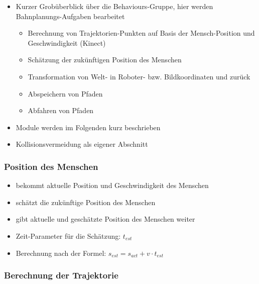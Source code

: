 \begin{itemize}
	\item Kurzer Grobüberblick über die Behaviours-Gruppe, hier werden Bahnplanungs-Aufgaben bearbeitet
	\begin{itemize}
		\item Berechnung von Trajektorien-Punkten auf Basis der Mensch-Position und Geschwindigkeit (Kinect)
		\item Schätzung der zukünftigen Position des Menschen
		\item Transformation von Welt- in Roboter- bzw. Bildkoordinaten und zurück
		\item Abspeichern von Pfaden
		\item Abfahren von Pfaden
	\end{itemize}
	\item Module werden im Folgenden kurz beschrieben
	\item Kollisionsvermeidung als eigener Abschnitt
\end{itemize}



\subsubsection{Position des Menschen}

\begin{itemize}
    \item bekommt aktuelle Position und Geschwindigkeit des Menschen
    \item schätzt die zukünftige Position des Menschen
    \item gibt aktuelle und geschätzte Position des Menschen weiter
    \item Zeit-Parameter für die Schätzung: $t_{est}$
    \item Berechnung nach der Formel: $s_{est} = s_{act} + v \cdot t_{est}$
\end{itemize}


\subsubsection{Berechnung der Trajektorie}

